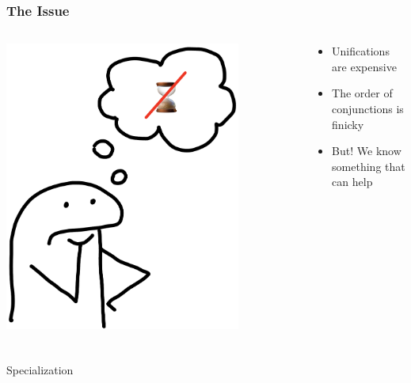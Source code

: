 \documentclass[xcolor={dvipsnames}, aspectratio=169]{beamer}
\begin{document}
\begin{frame}[fragile]
  \frametitle{The Issue}
  \begin{columns}    
    \begin{column}{0.35\textwidth}
      \centering
      \includegraphics[width=0.8\textwidth]{pic/slow.jpg}
    \end{column} \pause
    \begin{column}{0.75\textwidth} 
    \begin{itemize}
      \item Unifications are expensive
      \item The order of conjunctions is finicky
      \item But! We know something that can help
    \end{itemize}
    \end{column}
  \end{columns}

\end{frame}

\begin{frame}[fragile]
  \frametitle{}

\begin{center}
  \Large Specialization
\end{center}

\end{frame}
\end{document}

